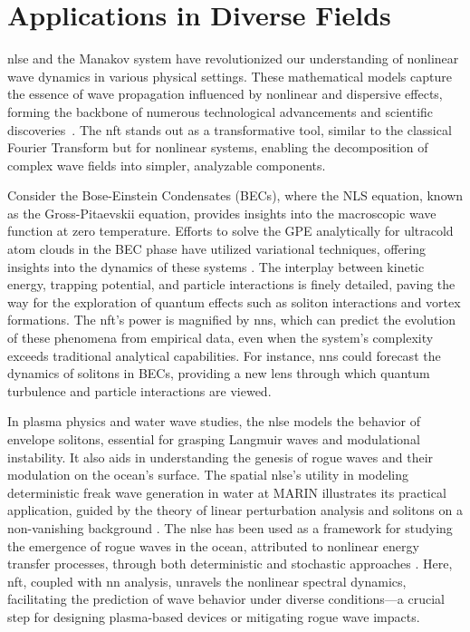 \section*{Applications in Diverse Fields}

\acrlong{nlse} and the Manakov system have revolutionized our understanding of nonlinear wave dynamics in various physical settings. These mathematical models capture the essence of wave propagation influenced by nonlinear and dispersive effects, forming the backbone of numerous technological advancements and scientific discoveries~\cite{karjanto2019nonlinear}. The \acrlong{nft} stands out as a transformative tool, similar to the classical Fourier Transform but for nonlinear systems, enabling the decomposition of complex wave fields into simpler, analyzable components.

Consider the Bose-Einstein Condensates (BECs), where the NLS equation, known as the Gross-Pitaevskii equation, provides insights into the macroscopic wave function at zero temperature. Efforts to solve the GPE analytically for ultracold atom clouds in the BEC phase have utilized variational techniques, offering insights into the dynamics of these systems \cite{perez1996low,perez1997dynamics}. The interplay between kinetic energy, trapping potential, and particle interactions is finely detailed, paving the way for the exploration of quantum effects such as soliton interactions and vortex formations. The \acrshort{nft}'s power is magnified by \acrlong{nn}s, which can predict the evolution of these phenomena from empirical data, even when the system's complexity exceeds traditional analytical capabilities. For instance, \acrlong{nn}s could forecast the dynamics of solitons in BECs, providing a new lens through which quantum turbulence and particle interactions are viewed.

In plasma physics and water wave studies, the \acrshort{nlse} models the behavior of envelope solitons, essential for grasping Langmuir waves and modulational instability. It also aids in understanding the genesis of rogue waves and their modulation on the ocean's surface. 
The spatial \acrshort{nlse}'s utility in modeling deterministic freak wave generation in water at MARIN illustrates its practical application, guided by the theory of linear perturbation analysis and solitons on a non-vanishing background \cite{van2006displaced,karjanto2006mathematical,karjanto2007extreme}. The \acrshort{nlse} has been used as a framework for studying the emergence of rogue waves in the ocean, attributed to nonlinear energy transfer processes, through both deterministic and stochastic approaches \cite{henderson1999unsteady,pelinovsky2008extreme,kharif2008rogue}.
Here, \acrshort{nft}, coupled with \acrlong{nn} analysis, unravels the nonlinear spectral dynamics, facilitating the prediction of wave behavior under diverse conditions—a crucial step for designing plasma-based devices or mitigating rogue wave impacts. 

